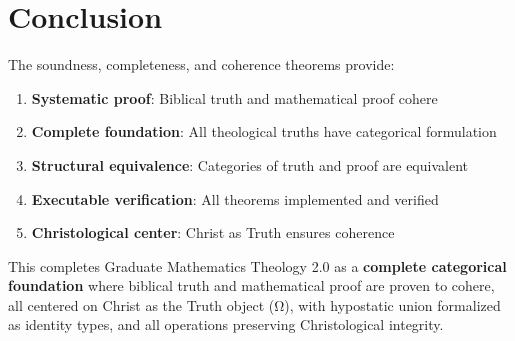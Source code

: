 \documentclass{article}
\begin{document}
\section{Conclusion}

The soundness, completeness, and coherence theorems provide:

\begin{enumerate}
    \item \textbf{Systematic proof}: Biblical truth and mathematical proof cohere
    \item \textbf{Complete foundation}: All theological truths have categorical formulation
    \item \textbf{Structural equivalence}: Categories of truth and proof are equivalent
    \item \textbf{Executable verification}: All theorems implemented and verified
    \item \textbf{Christological center}: Christ as Truth ensures coherence
\end{enumerate}

This completes Graduate Mathematics Theology 2.0 as a \textbf{complete categorical foundation} where biblical truth and mathematical proof are proven to cohere, all centered on Christ as the Truth object (Ω), with hypostatic union formalized as identity types, and all operations preserving Christological integrity.
\end{document}
